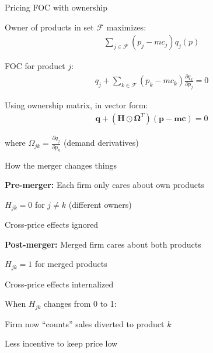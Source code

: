 \documentclass[notes,11pt, aspectratio=169]{beamer}
\newenvironment{wideitemize}{\itemize\addtolength{\itemsep}{10pt}}{\enditemize}
\begin{document}
\begin{frame}{Pricing FOC with ownership}
	\begin{wideitemize}
		\item Owner of products in set $\mathcal{F}$ maximizes:
		\begin{align*}
			\sum_{j \in \mathcal{F}} (p_j - mc_j) q_j(p)
		\end{align*}
		\item FOC for product $j$:
		\begin{align*}
			q_j + \sum_{k \in \mathcal{F}} (p_k - mc_k) \frac{\partial q_k}{\partial p_j} = 0
		\end{align*}
		\item Using ownership matrix, in vector form:
		\begin{align*}
			\mathbf{q} + (\mathbf{H} \odot \mathbf{\Omega}^T) (\mathbf{p} - \mathbf{mc}) = 0
		\end{align*}
		\item where $\Omega_{jk} = \frac{\partial q_j}{\partial p_k}$ (demand derivatives)
	\end{wideitemize}
\end{frame}

\begin{frame}{How the merger changes things}
	\begin{wideitemize}
		\item \textbf{Pre-merger:} Each firm only cares about own products
		\begin{wideitemize}
			\vspace{5pt}
			\item $H_{jk} = 0$ for $j \neq k$ (different owners)
			\item Cross-price effects ignored
		\end{wideitemize}
		\item \textbf{Post-merger:} Merged firm cares about both products
		\begin{wideitemize}
			\vspace{5pt}
			\item $H_{jk} = 1$ for merged products
			\item Cross-price effects internalized
		\end{wideitemize}
		\item When $H_{jk}$ changes from 0 to 1:
		\begin{wideitemize}
			\vspace{5pt}
			\item Firm now ``counts'' sales diverted to product $k$
			\item Less incentive to keep price low
		\end{wideitemize}
	\end{wideitemize}
\end{frame}
\end{document}
